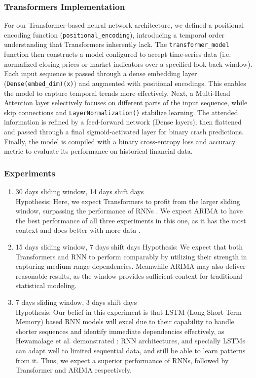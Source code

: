 \documentclass[12pt, letterpaper]{article}
\begin{document}
\subsubsection*{Transformers Implementation}
For our Transformer-based neural network architecture, we defined a positional encoding function (\texttt{positional\_encoding}), introducing a temporal order understanding that Transformers inherently lack. The \texttt{transformer\_model} function then constructs a model configured to accept time-series data (i.e. normalized closing prices or market indicators over a specified look-back window). Each input sequence is passed through a dense embedding layer (\texttt{Dense(embed\_dim)(x)}) and augmented with positional encodings. This enables the model to capture temporal trends more effectively. Next, a Multi-Head Attention layer selectively focuses on different parts of the input sequence, while skip connections and \texttt{LayerNormalization()} stabilize learning. The attended information is refined by a feed-forward network (Dense layers), then flattened and passed through a final sigmoid-activated layer for binary crash predictions. Finally, the model is compiled with a binary cross-entropy loss and accuracy metric to evaluate its performance on historical financial data.

\subsubsection*{Experiments}
    \begin{enumerate}
        \item 30 days sliding window, 14 days shift days\\
            Hypothesis: Here, we expect Transformers to profit from the larger sliding window, surpassing the performance of RNNs \cite{greff2017, sp500arimalstmregression}. We expect ARIMA to have the best performance of all three experiments in this one, as it has the most context and does better with more data \cite{ho2021}.
        \item 15 days sliding window, 7 days shift days
            Hypothesis: We expect that both Transformers and RNN to perform comparably by utilizing their strength in capturing medium range dependencies. Meanwhile ARIMA may also deliver reasonable results, as the window provides sufficient context for traditional statistical modeling.
        \item 7 days sliding window, 3 days shift days\\
            Hypothesis: Our belief in this experiment is that LSTM (Long Short Term Memory) based RNN models will excel due to their capability to handle shorter sequences and identify immediate dependencies effectively, as Hewamalage et al. demonstrated \cite{Hansika}: RNN architectures, and specially LSTMs can adapt well to limited sequential data, and still be able to learn patterns from it. Thus, we expect a superior performance of RNNs, followed by Transformer and ARIMA respectively.
    \end{enumerate}
\end{document}
